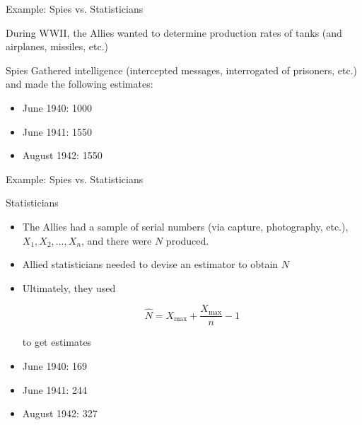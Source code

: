 \documentclass[10pt]{beamer}
\begin{document}
\begin{frame}[fragile]{Example: Spies vs. Statisticians}

During WWII, the Allies wanted to determine production rates of tanks (and airplanes, missiles, etc.)

\vfill

\begin{block}{Spies}
Gathered intelligence (intercepted messages, interrogated of prisoners, etc.) and made the following estimates:
\begin{itemize}
\item[] June 1940: 1000
\item[] June 1941: 1550
\item[] August 1942: 1550
\end{itemize}

\end{block}


\end{frame}

\begin{frame}[fragile]{Example: Spies vs. Statisticians}

\begin{block}{Statisticians}
\begin{itemize}
\item The Allies had a sample of serial numbers (via capture, photography, etc.), $X_1, X_2, \ldots, X_n$, and there were $N$ produced.
\item Allied statisticians needed to devise an \alert{estimator} to obtain $N$
\item Ultimately, they used

$$ \widehat{N} = X_{\text{max}} + \dfrac{X_{\text{max}}}{n} - 1 $$

to get estimates

\item[] June 1940: 169
\item[] June 1941: 244
\item[] August 1942: 327

\end{itemize}
\end{block}

\end{frame}
\end{document}
